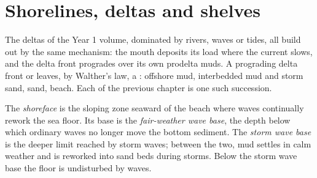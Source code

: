 \begin{omfigure}
\par{}\label{fig:b3:facies-models:rivers}
\end{omfigure}

\section{Shorelines, deltas and shelves}\label{sec:b3:facies-models:shelves}

The deltas of the Year 1 volume, dominated by rivers, waves or tides, all
build out by the same mechanism: the mouth deposits its load where the
current slows, and the delta front progrades over its own prodelta muds. A
prograding delta front or  leaves, by Walther's law, a
: offshore mud, interbedded mud and storm sand,
 sand, beach. Each  of the previous chapter is one such
succession.

\begin{definition}\label{def:b3:facies-models:shoreface}
The \emph{shoreface} is the sloping zone seaward of the
beach where waves continually rework the sea floor. Its base is the
\emph{fair-weather wave base}, the depth below
which ordinary waves no longer move the bottom sediment. The \emph{storm wave
base} is the deeper limit reached by storm waves;
between the two, mud settles in calm weather and is reworked into sand beds
during storms. Below the storm wave base the floor is undisturbed by waves.
\end{definition}

